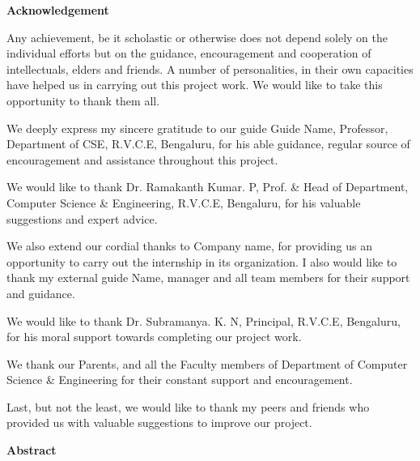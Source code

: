 \cleardoublepage




\begin{center}
	\huge\bfseries Acknowledgement
\end{center}

\bigskip

Any achievement, be it scholastic or otherwise does not depend solely on the individual efforts
but on the guidance, encouragement and cooperation of intellectuals, elders and friends.
A number of personalities, in their own capacities have helped us in carrying out this project work.
We would like to take this opportunity to thank them all. \bigskip

We deeply express my sincere gratitude to our guide Guide Name, Professor,
Department of CSE, R.V.C.E, Bengaluru, for his able guidance, regular source of encouragement and assistance
throughout this project. \bigskip

We would like to thank Dr. Ramakanth Kumar. P, Prof. \& Head of Department,
Computer Science \& Engineering, R.V.C.E, Bengaluru, for his valuable suggestions and expert advice.\bigskip

We also extend our cordial thanks to Company name, for providing us an opportunity to carry out the internship in its organization. I also would like to thank my external guide Name, manager and all team members for their support and guidance.\bigskip

We would like to thank Dr. Subramanya. K. N, Principal, R.V.C.E, Bengaluru, for his moral support towards completing our project work.\bigskip

We thank our Parents, and all the Faculty members of Department of
Computer Science \& Engineering for their constant support and encouragement.\bigskip

Last, but not the least, we would like to thank my peers and friends who
provided us with valuable suggestions to improve our project.

\pagebreak

\begin{center}
	\huge\bfseries Abstract
\end{center}

\bigskip



\pagebreak

\cleardoublepage

\tableofcontents
\listoffigures
\listoftables
\printglossary[type=\acronymtype,style=long,title=Glossary,nonumberlist]

\cleardoublepage